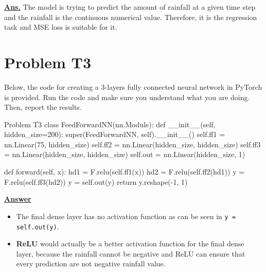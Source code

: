 \documentclass[12pt, a4paper]{article}
\begin{document}
            \vspace{1em}

            \noindent \underline{\textbf{Ans.}} The model is trying to predict the amount of rainfall at a given time step
            and the rainfall is the continuous numerical value. Therefore, it is the regression task and MSE loss is suitable for it.

	\pagebreak

        \section{Problem T3}
            Below, the code for creating a 3-layers fully connected neural network in PyTorch is provided.
            Run the code and make sure you understand what you are doing.
            Then, report the results.

            \begin{codeblock}{Problem T3}
                class FeedForwardNN(nn.Module):
                    def __init__(self, hidden_size=200):
                        super(FeedForwardNN, self).__init__()
                        self.ff1 = nn.Linear(75, hidden_size)
                        self.ff2 = nn.Linear(hidden_size, hidden_size)
                        self.ff3 = nn.Linear(hidden_size, hidden_size)
                        self.out = nn.Linear(hidden_size, 1)

                    def forward(self, x):
                        hd1 = F.relu(self.ff1(x))
                        hd2 = F.relu(self.ff2(hd1))
                        y = F.relu(self.ff3(hd2))
                        y = self.out(y)
                        return y.reshape(-1, 1)
            \end{codeblock}

            \noindent \underline{\textbf{Answer}}

            \begin{itemize}
                \item The final dense layer has no activation function as can be seen in \texttt{y = self.out(y)}.
                \item \textbf{ReLU} would actually be a better activation function for the final dense layer,
                because the rainfall cannot be negative and ReLU can ensure that every prediction are not negative rainfall value.
            \end{itemize}

	\pagebreak
\end{document}
